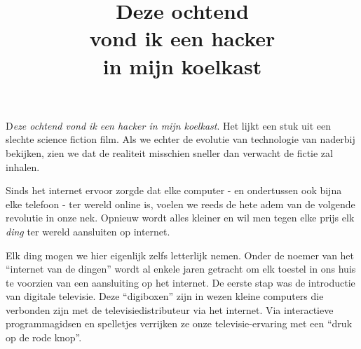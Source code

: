 \documentclass[DIV=calc,paper=a4,fontsize=11pt,twocolumn]{scrartcl}
\title{Deze ochtend\\vond ik een hacker\\in mijn koelkast}
\date{}
\newcommand{\initial}[1]{
\lettrine[lines=4,lhang=0.3,nindent=0em]{
\color{VeryDarkGrey}
{\textsf{#1}}}{}}
\begin{document}

\initial{D}\emph{eze ochtend vond ik een hacker in mijn koelkast}. Het lijkt
een stuk uit een slechte science fiction film. Als we echter de evolutie van
technologie van naderbij bekijken, zien we dat de realiteit misschien sneller
dan verwacht de fictie zal inhalen.

Sinds het internet ervoor zorgde dat elke computer - en ondertussen ook bijna
elke telefoon - ter wereld online is, voelen we reeds de hete adem van de
volgende revolutie in onze nek. Opnieuw wordt alles kleiner en wil men tegen
elke prijs elk \emph{ding} ter wereld aansluiten op internet.

Elk ding mogen we hier eigenlijk zelfs letterlijk nemen. Onder de noemer van
het ``internet van de dingen'' wordt al enkele jaren getracht om elk toestel in
ons huis te voorzien van een aansluiting op het internet. De eerste stap was de
introductie van digitale televisie. Deze ``digiboxen'' zijn in wezen kleine
computers die verbonden zijn met de televisiedistributeur via het internet. Via
interactieve programmagidsen en spelletjes verrijken ze onze televisie-ervaring
met een ``druk op de rode knop''.
\end{document}
